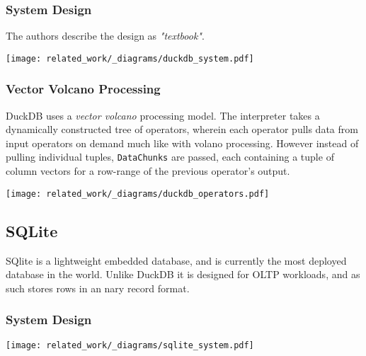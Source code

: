 \subsubsection{System Design}
The authors describe the design as \textit{"textbook"}\cite{DuckDBPaper}.
\begin{center}
    \texttt{[image: related\_work/\_diagrams/duckdb\_system.pdf]}
\end{center}
\subsubsection{Vector Volcano Processing}
DuckDB uses a \textit{vector volcano} processing model. The interpreter takes a dynamically constructed tree of operators, wherein each operator pulls data from input operators on demand much like with volano processing.
However instead of pulling individual tuples, \texttt{DataChunks} are passed, each containing a tuple of column vectors for a row-range of the previous operator's output.
\begin{center}
    \texttt{[image: related\_work/\_diagrams/duckdb\_operators.pdf]}
\end{center}


\subsection{SQLite}
SQlite is a lightweight embedded database\cite{SQLitePaper}, and is currently the most deployed database in the world\cite{SQLiteWebsite}.
Unlike DuckDB it is designed for OLTP workloads, and as such stores rows in an nary record format.
\subsubsection{System Design}
\begin{center}
    \texttt{[image: related\_work/\_diagrams/sqlite\_system.pdf]}
\end{center}
